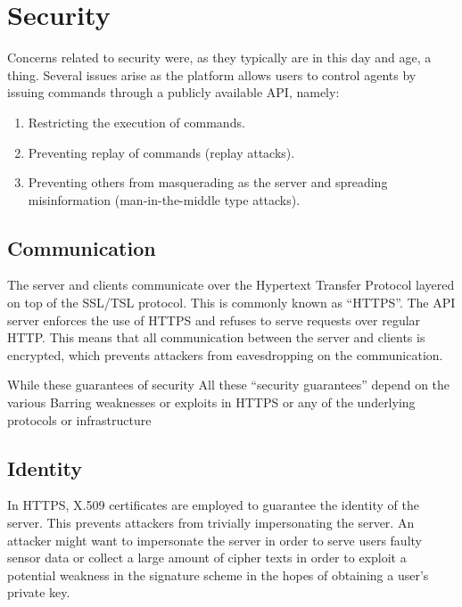 \section{Security}
Concerns related to security were, as they typically are in this day and age, a thing.
Several issues arise as the platform allows users to control agents by issuing commands through a publicly available API, namely:

\begin{enumerate}
	\item Restricting the execution of commands.
	\item Preventing replay of commands (replay attacks).
	\item Preventing others from masquerading as the server and spreading misinformation (man-in-the-middle type attacks).
\end{enumerate}

\subsection{Communication}
The server and clients communicate over the Hypertext Transfer Protocol layered on top of the SSL/TSL protocol. %
This is commonly known as ``HTTPS''.
The API server enforces the use of HTTPS and refuses to serve requests over regular HTTP.
This means that all communication between the server and clients is encrypted, which prevents attackers from eavesdropping on the communication.



While these guarantees of security 
All these ``security guarantees'' depend on the various  
Barring weaknesses or exploits in HTTPS or any of the underlying protocols or infrastructure


\subsection{Identity}
In HTTPS, X.509 certificates are employed to guarantee the identity of the server.
This prevents attackers from trivially impersonating the server.
An attacker might want to impersonate the server in order to serve users faulty sensor data or collect a large amount of cipher texts in order to exploit a potential weakness in the signature scheme in the hopes of obtaining a user's private key.

